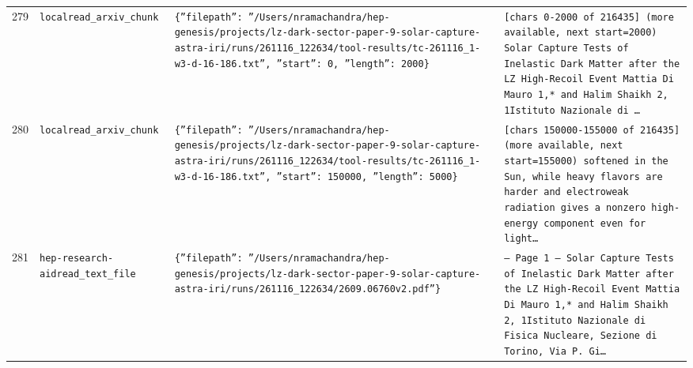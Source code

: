 \documentclass[11pt,a4paper]{article}
\begin{document}
\begin{longtable}{@{}p{}p{}p{}p{}@{}}
279 & \texttt{local}\newline\texttt{read\_\allowbreak{}arxiv\_\allowbreak{}chunk} & \texttt{\{''filepath'':\allowbreak{} ''/\allowbreak{}Users/\allowbreak{}nramachandra/\allowbreak{}hep-genesis/\allowbreak{}projects/\allowbreak{}lz-dark-sector-paper-9-solar-capture-astra-iri/\allowbreak{}runs/\allowbreak{}261116\_\allowbreak{}122634/\allowbreak{}tool-results/\allowbreak{}tc-261116\_\allowbreak{}1-w3-d-16-186.txt'',\allowbreak{} ''start'':\allowbreak{} 0,\allowbreak{} ''length'':\allowbreak{} 2000\}\allowbreak{}} & \texttt{[chars 0-2000 of 216435]\allowbreak{} (more available,\allowbreak{} next start=\allowbreak{}2000)\allowbreak{}  Solar Capture Tests of Inelastic Dark Matter after the LZ High-Recoil Event Mattia Di Mauro 1,\allowbreak{}* and Halim Shaikh 2,\allowbreak{}\dag{}\allowbreak{} 1Istituto Nazionale di \ldots{}\allowbreak{}} \\
280 & \texttt{local}\newline\texttt{read\_\allowbreak{}arxiv\_\allowbreak{}chunk} & \texttt{\{''filepath'':\allowbreak{} ''/\allowbreak{}Users/\allowbreak{}nramachandra/\allowbreak{}hep-genesis/\allowbreak{}projects/\allowbreak{}lz-dark-sector-paper-9-solar-capture-astra-iri/\allowbreak{}runs/\allowbreak{}261116\_\allowbreak{}122634/\allowbreak{}tool-results/\allowbreak{}tc-261116\_\allowbreak{}1-w3-d-16-186.txt'',\allowbreak{} ''start'':\allowbreak{} 150000,\allowbreak{} ''length'':\allowbreak{} 5000\}\allowbreak{}} & \texttt{[chars 150000-155000 of 216435]\allowbreak{} (more available,\allowbreak{} next start=\allowbreak{}155000)\allowbreak{}   softened in the Sun,\allowbreak{} while heavy flavors are harder and electroweak radiation gives a nonzero high-energy component even for light\ldots{}\allowbreak{}} \\
281 & \texttt{hep-research-aid}\newline\texttt{read\_\allowbreak{}text\_\allowbreak{}file} & \texttt{\{''filepath'':\allowbreak{} ''/\allowbreak{}Users/\allowbreak{}nramachandra/\allowbreak{}hep-genesis/\allowbreak{}projects/\allowbreak{}lz-dark-sector-paper-9-solar-capture-astra-iri/\allowbreak{}runs/\allowbreak{}261116\_\allowbreak{}122634/\allowbreak{}2609.06760v2.pdf''\}\allowbreak{}} & \texttt{--- Page 1 --- Solar Capture Tests of Inelastic Dark Matter after the LZ High-Recoil Event Mattia Di Mauro 1,\allowbreak{}* and Halim Shaikh 2,\allowbreak{}\dag{}\allowbreak{} 1Istituto Nazionale di Fisica Nucleare,\allowbreak{} Sezione di Torino,\allowbreak{} Via P. Gi\ldots{}\allowbreak{}} \\

\end{longtable}
\end{document}
